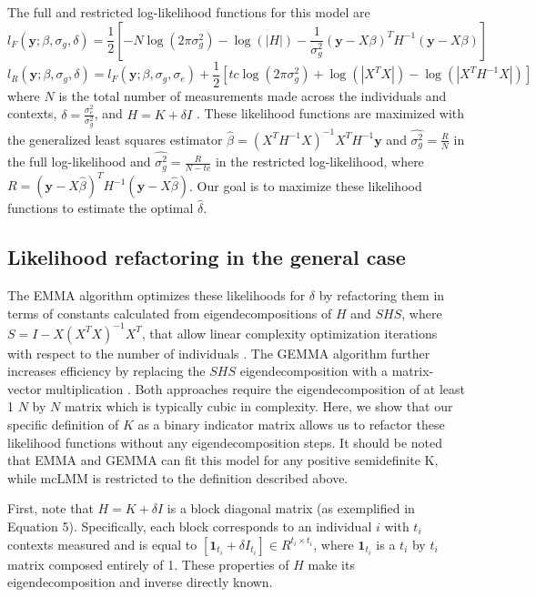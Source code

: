         The full and restricted log-likelihood functions for this model are
        \begin{equation}
            l_F(\mathbf{y}; \beta, \sigma_g, \delta) = \frac{1}{2}\left[-N\log{(2\pi\sigma^2_g)} - \log(|H|) - \frac{1}{\sigma^2_g}(\mathbf{y}-X\beta)^T H^{-1} (\mathbf{y}-X\beta)\right]
        \end{equation}
        \begin{equation}
            l_R(\mathbf{y}; \beta, \sigma_g, \delta) = l_F(\mathbf{y}; \beta, \sigma_g, \sigma_e) + \frac{1}{2}\left[tc\log(2\pi\sigma^2_g) + \log{(|X^TX|)} - \log{(|X^TH^{-1}X|)}\right]
        \end{equation}
        where $N$ is the total number of measurements made across the individuals and contexts, $\delta = \frac{\sigma^2_e}{\sigma^2_g}$, and $H = K + \delta I$  \cite{Welham}. These likelihood functions are maximized with the generalized least squares estimator $\hat{\beta} = (X^TH^{-1}X)^{-1}X^TH^{-1}\mathbf{y}$ and $\hat{\sigma^2_g} = \frac{R}{N}$ in the full log-likelihood and $\hat{\sigma^2_g} = \frac{R}{N-tc}$ in the restricted log-likelihood, where $R = (\mathbf{y}-X\hat{\beta})^TH^{-1}(\mathbf{y}-X\hat{\beta})$.  Our goal is to maximize these likelihood functions to estimate the optimal $\hat{\delta}$.
    
    \subsection{Likelihood refactoring in the general case}
        The EMMA algorithm optimizes these likelihoods for $\delta$ by refactoring them in terms of constants calculated from eigendecompositions of $H$ and $SHS$, where $S = I - X(X^TX)^{-1}X^T$, that allow linear complexity optimization iterations with respect to the number of individuals  \cite{Kang}. The GEMMA algorithm further increases efficiency by replacing the $SHS$ eigendecomposition with a matrix-vector multiplication \cite{Zhou}. Both approaches require the eigendecomposition of at least 1 $N$ by $N$ matrix which is typically cubic in complexity. Here, we show that our specific definition of $K$ as a binary indicator matrix allows us to refactor these likelihood functions without any eigendecomposition steps. It should be noted that EMMA and GEMMA can fit this model for any positive semidefinite K, while mcLMM is restricted to the definition described above. 
        
        First, note that $H = K + \delta I$ is a block diagonal matrix (as exemplified in Equation 5). Specifically, each block corresponds to an individual $i$ with $t_i$ contexts measured and is equal to $[\mathbf{1}_{t_i} + \delta I_{t_i}] \in R^{t_i \times t_i}$, where $\mathbf{1}_{t_i}$ is a $t_i$ by $t_i$ matrix composed entirely of 1. These properties of $H$ make its eigendecomposition and inverse directly known.
        
